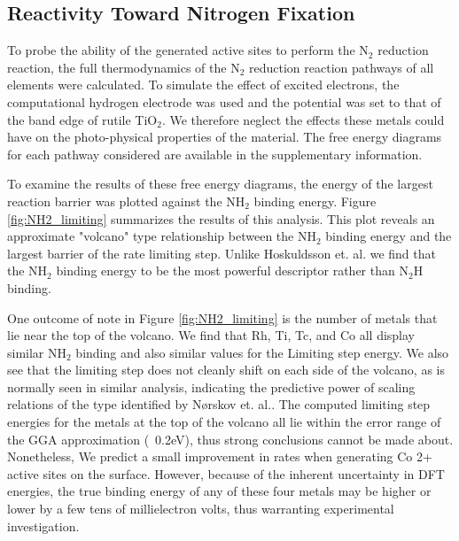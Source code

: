 \documentclass[catalysts,article,submit,moreauthors,pdftex,10pt,a4paper]{mdpi}
\theoremstyle{mdpi}
\newcounter{ex}
\newcounter{re}
\theoremstyle{mdpidefinition}
\begin{document}

\subsection{Reactivity Toward Nitrogen Fixation}

To probe the ability of the generated active sites to perform the N$_2$ reduction reaction, the full thermodynamics of the N$_2$ reduction reaction pathways of all elements were calculated. To simulate the effect of excited electrons, the computational hydrogen electrode was used and the potential was set to that of the band edge of rutile TiO$_2$. We therefore neglect the effects these metals could have on the photo-physical properties of the material. The free energy diagrams for each pathway considered are available in the supplementary information.

To examine the results of these free energy diagrams, the energy of the largest reaction barrier was plotted against the NH$_2$ binding energy. Figure \ref{fig:NH2_limiting} summarizes the results of this analysis. This plot reveals an approximate "volcano" type relationship between the NH$_2$ binding energy and the largest barrier of the rate limiting step. Unlike Hoskuldsson et. al.\cite{Hoskuldsson_2017} we find that the NH$_2$ binding energy to be the most powerful descriptor rather than N$_2$H binding.

One outcome of note in Figure \ref{fig:NH2_limiting} is the number of metals that lie near the top of the volcano. We find that Rh, Ti, Tc, and Co all display similar NH$_2$ binding and also similar values for the Limiting step energy. We also see that the limiting step does not cleanly shift on each side of the volcano, as is normally seen in similar analysis, indicating the predictive power of scaling relations of the type identified by N{\o}rskov et. al.\cite{N_rskov_2004}. The computed limiting step energies for the metals at the top of the volcano all lie within the error range of the GGA approximation (~0.2eV), thus strong conclusions cannot be made about. Nonetheless, We predict a small improvement in rates when generating Co 2+ active sites on the surface. However, because of the inherent uncertainty in DFT energies, the true binding energy of any of these four metals may be higher or lower by a few tens of millielectron volts, thus warranting experimental investigation.
\end{document}
